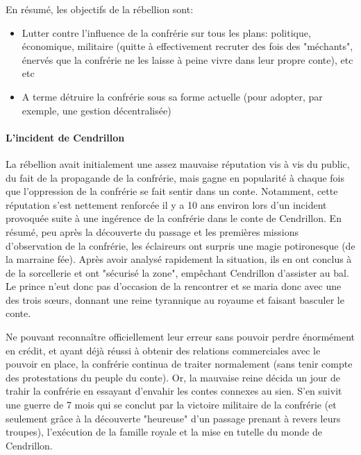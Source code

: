 {	\par En résumé, les objectifs de la rébellion sont:
	\begin{itemize}
		\item Lutter contre l'influence de la confrérie sur tous les plans: politique, économique, militaire (quitte à effectivement recruter des fois des "méchants", énervés que la confrérie ne les laisse à peine vivre dans leur propre conte), etc etc
		\item A terme détruire la confrérie sous sa forme actuelle (pour adopter, par exemple, une gestion décentralisée)
	\end{itemize}
	
	
	\paragraph{L'incident de Cendrillon} La rébellion avait initialement une assez mauvaise réputation vis à vis du public, du fait de la propagande de la confrérie, mais gagne en popularité à chaque fois que l'oppression de la confrérie se fait sentir dans un conte. Notamment, cette réputation s'est nettement renforcée il y a 10 ans environ lors d'un incident provoquée suite à une ingérence de la confrérie dans le conte de Cendrillon. En résumé, peu après la découverte du passage et les premières missions d'observation de la confrérie, les éclaireurs ont surpris une magie potironesque (de la marraine fée). Après avoir analysé rapidement la situation, ils en ont conclus à de la sorcellerie et ont "sécurisé la zone", empêchant Cendrillon d'assister au bal. Le prince n'eut donc pas d'occasion de la rencontrer et se maria donc avec une des trois sœurs, donnant une reine tyrannique au royaume et faisant basculer le conte.

	\par Ne pouvant reconnaître officiellement leur erreur sans pouvoir perdre énormément en crédit, et ayant déjà réussi à obtenir des relations commerciales avec le pouvoir en place, la confrérie continua de traiter normalement (sans tenir compte des protestations du peuple du conte). Or, la mauvaise reine décida un jour de trahir la confrérie en essayant d'envahir les contes connexes au sien. S'en suivit une guerre de 7 mois qui se conclut par la victoire militaire de la confrérie (et seulement grâce à la découverte "heureuse" d'un passage prenant à revers leurs troupes), l'exécution de la famille royale et la mise en tutelle du monde de Cendrillon.
	
	
}
